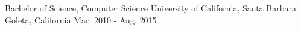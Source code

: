 

\begin{cventries}

  \cventry
    {Bachelor of Science, Computer Science} %
    {University of California, Santa Barbara} %
    {Goleta, California} %
    {Mar. 2010 - Aug. 2015} %
    {
    \begin{cvitems} %
     \end{cvitems}
    }

\end{cventries}



